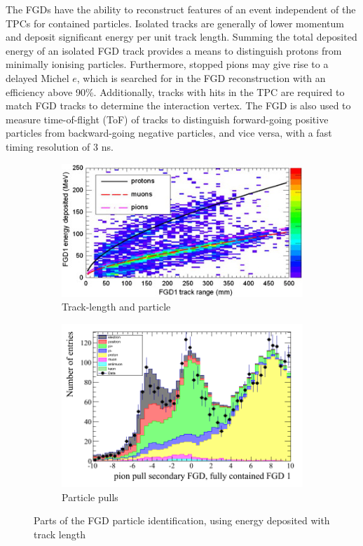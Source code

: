 The FGDs have the ability to reconstruct features of an event independent of the TPCs for contained particles. Isolated tracks are generally of lower momentum and deposit significant energy per unit track length. Summing the total deposited energy of an isolated FGD track provides a means to distinguish protons from minimally ionising particles. Furthermore, stopped pions may give rise to a delayed Michel $e$, which is searched for in the FGD reconstruction with an efficiency above 90\%\cite{thesis_christine}. Additionally, tracks with hits in the TPC are required to match FGD tracks to determine the interaction vertex. The FGD is also used to measure time-of-flight (ToF) of tracks to distinguish forward-going positive particles from backward-going negative particles, and vice versa, with a fast timing resolution of 3 ns.
\begin{figure}[h]
	\begin{subfigure}[t]{0.47\textwidth}
		\includegraphics[width=\textwidth, trim={0mm 0mm 0mm 0mm}, clip,page=1]{figures/det_chap/fgd/fgd_byrange}
		\caption{Track-length and particle}
	\end{subfigure}
	\begin{subfigure}[t]{0.47\textwidth}
		\includegraphics[width=\textwidth, trim={0mm 0mm 0mm 0mm}, clip,page=1]{figures/numu/Cuts/pull_secondarytrack_FGD_all_fullycontained}
		\caption{Particle pulls}
	\end{subfigure}	
	\caption{Parts of the FGD particle identification, using energy deposited with track length}
	\label{fig:fgd_reco}
\end{figure}

